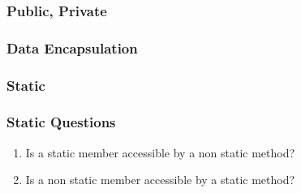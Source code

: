 \begin{frame}[fragile]
\frametitle{Public, Private}
\end{frame}

\begin{frame}[fragile]
\frametitle{Data Encapsulation}
\end{frame}

\begin{frame}[fragile]
\frametitle{Static}
\end{frame}

\begin{frame}[fragile]
\frametitle{Static Questions}
\begin{exercise}
\begin{enumerate}
\item Is a static member accessible by a non static method?
\item Is a non static member accessible by a static method?
\end{enumerate}
\end{exercise}
\end{frame}

